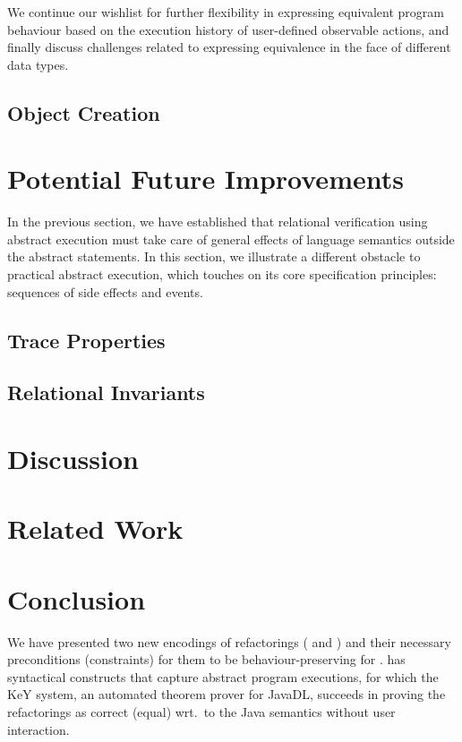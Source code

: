 \documentclass[runningheads]{llncs}
\begin{document}
We continue our wishlist for further flexibility in expressing equivalent program behaviour based on the execution history of user-defined observable actions,
and finally discuss challenges related to expressing equivalence in the face of different data types.


\subsection{Object Creation}\label{sec:objectcreation}


\section{Potential Future Improvements}\label{sec:future}
In the previous section, we have established that relational verification using abstract execution
must take care of general effects of language semantics outside the abstract statements.
In this section, we illustrate a different obstacle to practical abstract execution, which touches on its core specification principles: sequences of side effects and events.

\subsection{Trace Properties}\label{sec:traces}


\subsection{Relational Invariants}\label{sec:relational}


\section{Discussion}\label{sec:discussion}


\section{Related Work}\label{sec:related}



\section{Conclusion}\label{sec:conclusion}

We have presented two new encodings of refactorings ( and ) and their necessary preconditions (constraints) for them to be behaviour-preserving for \Refinity{}.
\Refinity{} has syntactical constructs that capture abstract program executions, for which the KeY system,
an automated theorem prover for JavaDL, succeeds in proving the refactorings as correct (equal) wrt.\ to the Java semantics without user interaction.
\end{document}
